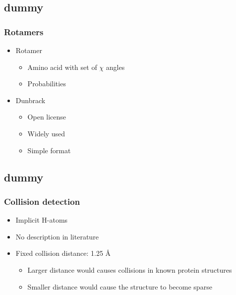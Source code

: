 \documentclass{beamer}
\begin{document}
\subsection{dummy}
\begin{frame}
	\frametitle{Rotamers}
	
	\begin{itemize}
		\item Rotamer
		\begin{itemize}
			\item Amino acid with set of $\chi$ angles
			\item Probabilities
		\end{itemize}
		\item Dunbrack
		\begin{itemize}
			\item Open license
			\item Widely used
			\item Simple format
		\end{itemize}
	\end{itemize}
	
\end{frame}

\subsection{dummy}
\begin{frame}
	\frametitle{Collision detection}
	
	\begin{itemize}
		\item Implicit H-atoms
		\item No description in literature
		\item Fixed collision distance: 1.25 Å
		\begin{itemize}
			\item Larger distance would causes collisions in known protein structures
			\item Smaller distance would cause the structure to become sparse
		\end{itemize}
	\end{itemize}
	
\end{frame}
\end{document}
